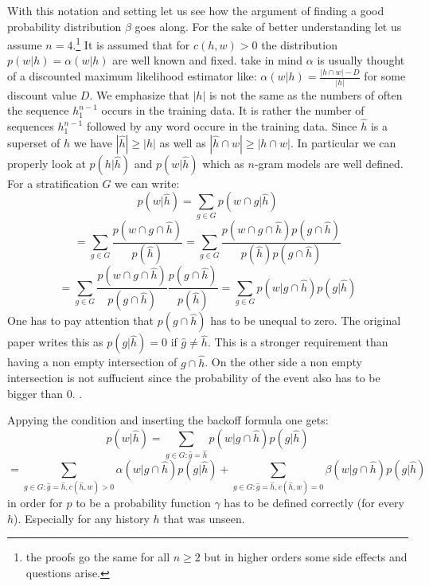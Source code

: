 \begin{appendix}
With this notation and setting let us see how the argument of finding a good probability distribution $\beta$ goes along. 
For the sake of better understanding let us assume $n=4$.\footnote{the proofs go the same for all $n\geq 2$ but in higher orders some side effects and questions arise.}
It is assumed that for $c(h,w)>0$ the distribution $p(w|h)=\alpha(w|h)$ are well known and fixed. 
take in mind $\alpha$ is usually thought of a discounted maximum likelihood estimator like: $\alpha(w|h)=\frac{|h \cap w|-D}{|h|}$ for some discount value $D$.
We emphasize that $|h|$ is not the same as the numbers of often the sequence $h_1^{n-1}$ occurs in the training data.
It is rather the number of sequences $h_1^{n-1}$ followed by any word occure in the training data. 
Since $\hat h$ is a superset of $h$ we have $|\hat h| \geq |h|$ as well as $|\hat h \cap w| \geq |h \cap w|$.
In particular we can properly look at $p(h|\hat h)$ and $p(w|\hat h)$ which as $n$-gram models are well defined.
For a stratification $G$ we can write: 
\[
p(w|\hat h) = \sum_{g\in G}p(w\cap g|\hat h)
\]
\[
=\sum_{g\in G}\frac{p(w \cap g \cap \hat h)}{p(\hat h)}=\sum_{g\in G}\frac{p(w \cap g \cap \hat h)p(g \cap \hat h)}{p(\hat h)p(g \cap \hat h)}
\]
\[
=\sum_{g\in G}\frac{p(w \cap g \cap \hat h)}{p(g\cap \hat h)}\frac{p(g\cap\hat h)}{p(\hat h)} = \sum_{g\in G}p(w|g\cap \hat h)p(g|\hat h)
\]
One has to pay attention that $p(g\cap \hat h)$ has to be unequal to zero. 
The original paper writes this as $p(g|\hat h)=0$ if $\hat g \neq \hat h$. 
This is a stronger requirement than having a non empty intersection of $g \cap \hat h$. 
On the other side a non empty intersection is not suffucient since the probability of the event also has to be bigger than 0.
.

Appying the condition and inserting the backoff formula one gets:
\[
p(w|\hat h) =  \sum_{g\in G:\hat g = \hat h}p(w|g\cap \hat h)p(g|\hat h)
\]
\[
=  \sum_{g\in G:\hat g = \hat h, c(\hat h, w)>0}\alpha(w|g\cap \hat h)p(g|\hat h) +  \sum_{g\in G:\hat g = \hat h, c(\hat h,w)=0}\beta(w|g\cap \hat h)p(g|\hat h)
\]
in order for $p$ to be a probability function $\gamma$ has to be defined correctly (for every $h$). 
Especially for any history $h$ that was unseen. 


\end{appendix}
